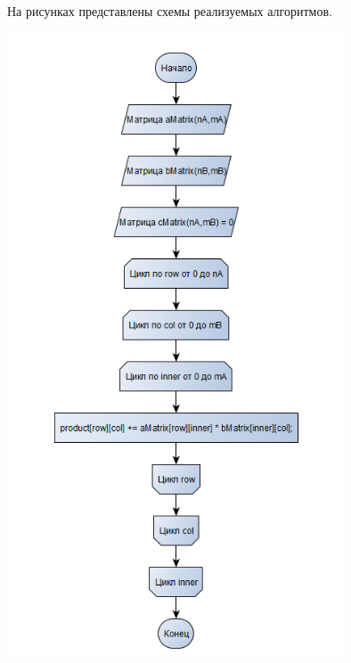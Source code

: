 \documentclass[12pt,a4paper]{scrartcl}
\begin{document}
На рисунках представлены схемы реализуемых алгоритмов.

\begin{center}
	\centering
	\includegraphics[width=10cm]{multmatrix}\\
	\label{fig:first}
\end{center}
\end{document}
